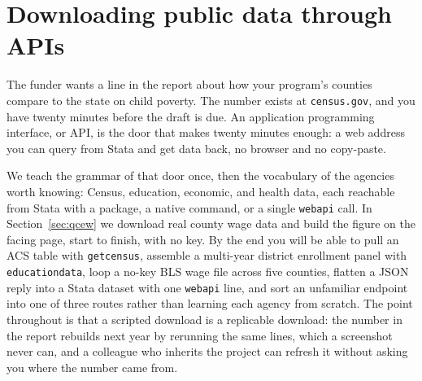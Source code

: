 \documentclass[
    a4paper,
    fontsize=10pt,
    twoside=true,
    numbers=noenddot,
]{kaobook}
\begin{document}

\chapter{Downloading public data through APIs}\label{ch:apis}

The funder wants a line in the report about how your program's counties compare to the state on child poverty. The number exists at \texttt{census.gov}, and you have twenty minutes before the draft is due. An application programming interface, or API, is the door that makes twenty minutes enough: a web address you can query from Stata and get data back, no browser and no copy-paste.

We teach the grammar of that door once, then the vocabulary of the agencies worth knowing: Census, education, economic, and health data, each reachable from Stata with a package, a native command, or a single \texttt{webapi} call. In Section~\ref{sec:qcew} we download real county wage data and build the figure on the facing page, start to finish, with no key. By the end you will be able to pull an ACS table with \texttt{getcensus}, assemble a multi-year district enrollment panel with \texttt{educationdata}, loop a no-key BLS wage file across five counties, flatten a JSON reply into a Stata dataset with one \texttt{webapi} line, and sort an unfamiliar endpoint into one of three routes rather than learning each agency from scratch. The point throughout is that a scripted download is a replicable download: the number in the report rebuilds next year by rerunning the same lines, which a screenshot never can, and a colleague who inherits the project can refresh it without asking you where the number came from.
\end{document}
